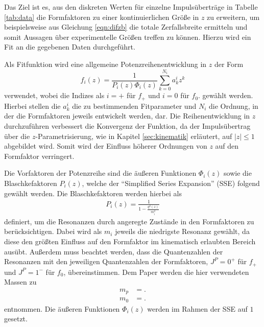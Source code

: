 Das Ziel ist es, aus den diskreten Werten für einzelne Impulsüberträge in Tabelle \ref{tab:data} die Formfaktoren zu einer kontinuierlichen Größe in $z$ zu erweitern, um beispielsweise aus Gleichung \eqref{eqn:difzb} die totale Zerfallsbreite ermitteln  und somit Aussagen über experimentelle Größen treffen zu können.
Hierzu wird ein Fit an die gegebenen Daten durchgeführt.

Als Fitfunktion wird eine allgemeine Potenzreihenentwicklung in $z$ der Form
\begin{equation}
  \label{eqn:reihenentwicklung}
  f_i(z) = \frac{1}{P_i(z) \Phi_i(z)} \sum_{k=0}^{N_i} a_{k}^{i} z^{k}
\end{equation}
verwendet, wobei die Indizes als $i=+$ für $f_+$ und $i=0$ für $f_0$. gewählt werden.
Hierbei stellen die $a_{k}^{i}$ die zu bestimmenden Fitparameter und $N_i$ die Ordnung, in der die Formfaktoren jeweils entwickelt werden, dar.
Die Reihenentwicklung in $z$ durchzuführen verbessert die Konvergenz der Funktion, da der Impulsübertrag über die $z$-Parametrisierung, wie in Kapitel \ref{sec:kinematik} erläutert, auf $\lvert z \rvert \leq 1$ abgebildet wird.
Somit wird der Einfluss höherer Ordnungen von $z$ auf den Formfaktor verringert. 

Die Vorfaktoren der Potenzreihe sind die äußeren Funktionen  $\Phi_i(z)$ sowie die Blaschkefaktoren $P_i(z)$, welche der \enquote{Simplified Series Expansion} (SSE) \cite{PhysRevD.79.013008} folgend gewählt werden.
Die Blaschkefaktoren werden hierbei als
\begin{align*}
  P_i(z) = \frac{1}{1 - \frac{q^2(z)}{m_i^2}}
\end{align*}
definiert, um die Resonanzen durch angeregte Zustände in den Formfaktoren zu berücksichtigen. 
Dabei wird als $m_i$ jeweils die niedrigste Resonanz gewählt, da diese den größten Einfluss auf den Formfaktor im kinematisch erlaubten Bereich ausübt.
Außerdem muss beachtet werden, dass die Quantenzahlen der Resonanzen mit den jeweiligen Quantenzahlen der Formfaktoren, $J^P = 0^{+}$ für $f_+$ und $J^P = 1^-$ für $f_0$, übereinstimmen.
Dem Paper \cite{PhysRevD.94.094008} werden die hier verwendeten Massen zu
\begin{align*}
  m_p &= .\\
  m_0 & = .
\end{align*}
entnommen.
Die äußeren Funktionen $\Phi_i(z)$ werden im Rahmen der SSE auf $\num{1}$ gesetzt.

